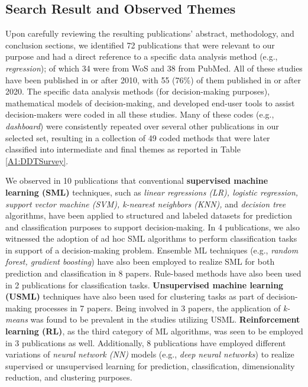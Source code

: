 \documentclass{sfuthesis}
\begin{document}
\subsection{Search Result and Observed Themes}
Upon carefully reviewing the resulting publications’ abstract, methodology, and conclusion sections, we identified 72 publications that were relevant to our purpose and had a direct reference to a specific data analysis method (e.g., \textit{regression}); of which 34 were from WoS and 38 from PubMed. All of these studies have been published in or after 2010, with 55 (76\%) of them published in or after 2020. The specific data analysis methods (for decision-making purposes), mathematical models of decision-making, and developed end-user tools to assist decision-makers were coded in all these studies. Many of these codes (e.g., \textit{dashboard}) were consistently repeated over several other publications in our selected set, resulting in a collection of 49 coded methods that were later classified into intermediate and final themes as reported in Table \ref{A1:DDTSurvey}.\par
We observed in 10 publications that conventional \textbf{supervised machine learning (SML)} techniques, such as \textit{linear regressions (LR), logistic regression, support vector machine (SVM), k-nearest neighbors (KNN),} and \textit{decision tree} algorithms, have been applied to structured and labeled datasets for prediction and classification purposes to support decision-making. In 4 publications, we also witnessed the adoption of ad hoc SML algorithms to perform classification tasks in support of a decision-making problem. Ensemble ML techniques (e.g., \textit{random forest, gradient boosting}) have also been employed to realize SML for both prediction and classification in 8 papers. Rule-based methods have also been used in 2 publications for classification tasks. \textbf{Unsupervised machine learning (USML)} techniques have also been used for clustering tasks as part of decision-making processes in 7 papers. Being involved in 3 papers, the application of \textit{k-means} was found to be prevalent in the studies utilizing USML. \textbf{Reinforcement learning (RL)}, as the third category of ML algorithms, was seen to be employed in 3 publications as well. Additionally, 8 publications have employed different variations of \textit{neural network (NN)} models (e.g., \textit{deep neural networks}) to realize supervised or unsupervised learning for prediction, classification, dimensionality reduction, and clustering purposes.\par
\end{document}
